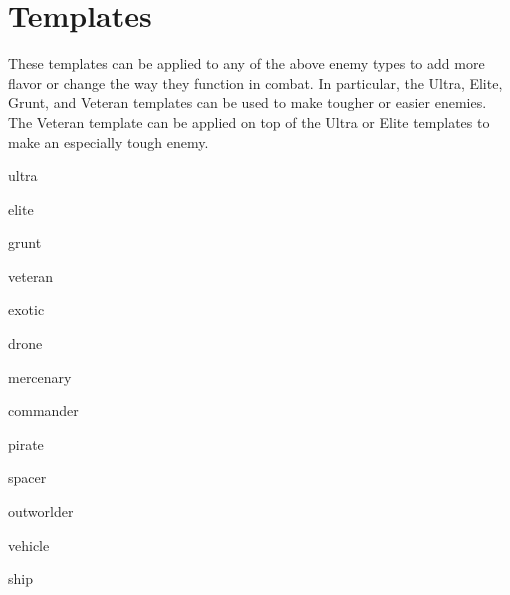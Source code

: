 \section{Templates}

These templates can be applied to any of the above enemy types to add more flavor or change
the way they function in combat. In particular, the Ultra, Elite, Grunt, and Veteran templates can
be used to make tougher or easier enemies. The Veteran template can be applied on top of the
Ultra or Elite templates to make an especially tough enemy.

{ultra}

{elite}

{grunt}

{veteran}

{exotic}

{drone}

{mercenary}

{commander}

{pirate}

{spacer}

{outworlder}

{vehicle}

{ship}

